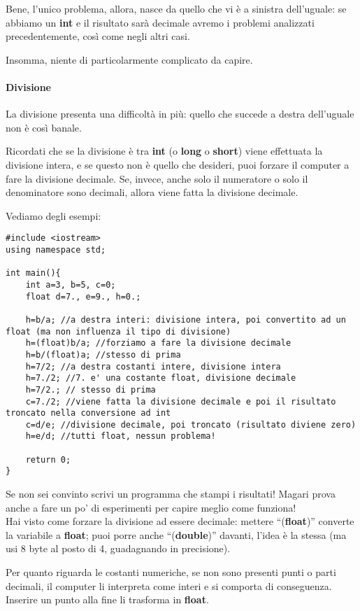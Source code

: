 	Bene, l'unico problema, allora, nasce da quello che vi è a sinistra dell'uguale: se abbiamo un \textbf{int} e il risultato sarà decimale avremo i problemi analizzati precedentemente, così come negli altri casi.
	
	Insomma, niente di particolarmente complicato da capire. 
	
	\paragraph{Divisione}
	La divisione presenta una difficoltà in più: quello che succede a destra dell'uguale non è così banale. 
	
	Ricordati che se la divisione è tra \textbf{int} (o \textbf{long} o \textbf{short}) viene effettuata la divisione intera, e se questo non è quello che desideri, puoi forzare il computer a fare la divisione decimale.
	Se, invece, anche solo il numeratore o solo il denominatore sono decimali, allora viene fatta la divisione decimale.
	
	Vediamo degli esempi:
	\begin{lstlisting}
#include <iostream>
using namespace std;

int main(){
	int a=3, b=5, c=0;
	float d=7., e=9., h=0.;
	
	h=b/a; //a destra interi: divisione intera, poi convertito ad un float (ma non influenza il tipo di divisione)
	h=(float)b/a; //forziamo a fare la divisione decimale
	h=b/(float)a; //stesso di prima
	h=7/2; //a destra costanti intere, divisione intera
	h=7./2; //7. e' una costante float, divisione decimale
	h=7/2.; // stesso di prima
	c=7./2; //viene fatta la divisione decimale e poi il risultato troncato nella conversione ad int
	c=d/e; //divisione decimale, poi troncato (risultato diviene zero)
	h=e/d; //tutti float, nessun problema!
	
	return 0;
}
	\end{lstlisting}
	
	Se non sei convinto scrivi un programma che stampi i risultati! Magari prova anche a fare un po' di esperimenti per capire meglio come funziona!
	\\
	
	Hai visto come forzare la divisione ad essere decimale: mettere ``(\textbf{float})'' converte la variabile a \textbf{float}; puoi porre anche ``(\textbf{double})'' davanti, l'idea è la stessa (ma usi 8 byte al posto di 4, guadagnando in precisione).
	
	Per quanto riguarda le costanti numeriche, se non sono presenti punti o parti decimali, il computer li interpreta come interi e si comporta di conseguenza. Inserire un punto alla fine li trasforma in \textbf{float}.
	
